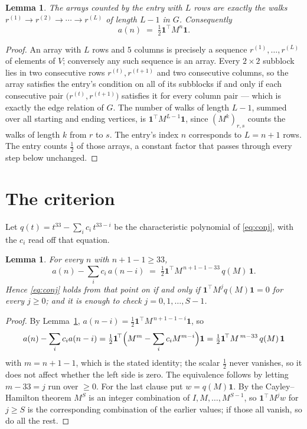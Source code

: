 \documentclass[11pt,a4paper]{article}
\theoremstyle{plain}
\newtheorem{lemma}[theorem]{Lemma}
\theoremstyle{definition}
\begin{document}
\begin{lemma}\label{lem:walk}
The arrays counted by the entry with $L$ rows are exactly the walks
$r^{(1)}\to r^{(2)}\to\cdots\to r^{(L)}$ of length $L-1$ in $G$. Consequently
\[
a(n)\;=\;\tfrac1{2}\mathbf{1}^{\!\top}M^{n}\mathbf{1} .
\]
\end{lemma}

\begin{proof}
An array with $L$ rows and $5$ columns is precisely a sequence
$r^{(1)},\dots,r^{(L)}$ of elements of $V$; conversely any such sequence is an array.
Every $2\times2$ subblock lies in two consecutive rows $r^{(t)},r^{(t+1)}$ and two
consecutive columns, so the array satisfies the entry's condition on all of its subblocks
if and only if each consecutive pair $\bigl(r^{(t)},r^{(t+1)}\bigr)$ satisfies it for
every column pair --- which is exactly the edge relation of $G$. The number of walks of
length $L-1$, summed over all starting and ending vertices, is
$\mathbf{1}^{\!\top}M^{L-1}\mathbf{1}$, since $(M^{k})_{r,s}$ counts the walks of
length $k$ from $r$ to $s$. The entry's index $n$ corresponds to $L=n+1$ rows. The entry counts $\tfrac1{2}$ of those arrays, a constant factor that passes through every step below unchanged.
\end{proof}

\section{The criterion}

Let $q(t)=t^{33}-\sum_i c_i\,t^{33-i}$ be the characteristic polynomial of
\eqref{eq:conj}, with the $c_i$ read off that equation.

\begin{lemma}\label{lem:crit}
For every $n$ with $n+1-1\ge33$,
\[
a(n)-\sum_i c_i\,a(n-i)\;=\;\tfrac1{2}\mathbf{1}^{\!\top}M^{\,n+1-1-33}\,q(M)\,\mathbf{1} .
\]
Hence \eqref{eq:conj} holds from that point on if and only if
$\mathbf{1}^{\!\top}M^{j}q(M)\mathbf{1}=0$ for every $j\ge0$; and it is enough to check
$j=0,1,\dots,S-1$.
\end{lemma}

\begin{proof}
By Lemma~\ref{lem:walk}, $a(n-i)=\tfrac1{2}\mathbf{1}^{\!\top}M^{\,n+1-1-i}\mathbf{1}$, so
\[
a(n)-\sum_i c_i a(n-i)
=\tfrac1{2}\mathbf{1}^{\!\top}\Bigl(M^{m}-\sum_i c_i M^{m-i}\Bigr)\mathbf{1}
=\tfrac1{2}\mathbf{1}^{\!\top}M^{\,m-33}\,q(M)\,\mathbf{1}
\]
with $m=n+1-1$, which is the stated identity; the scalar $\tfrac1{2}$ never vanishes, so
it does not affect whether the left side is zero. The equivalence follows by letting
$m-33=j$ run over $\ge0$. For the last clause put $w=q(M)\mathbf{1}$. By the
Cayley--Hamilton theorem $M^{S}$ is an integer combination of $I,M,\dots,M^{S-1}$, so
$\mathbf{1}^{\!\top}M^{j}w$ for $j\ge S$ is the corresponding combination of the earlier
values; if those all vanish, so do all the rest.
\end{proof}
\end{document}

